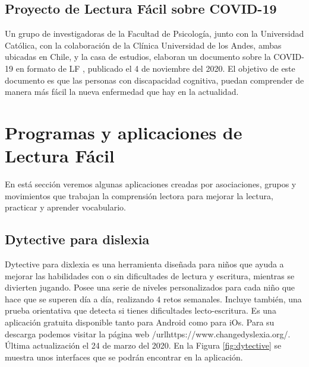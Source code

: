 \subsection{Proyecto de Lectura Fácil sobre COVID-19}

Un grupo de investigadoras de la Facultad de Psicología, junto con la Universidad Católica, con la colaboración de la Clínica Universidad de los Andes, ambas ubicadas en Chile, y la casa de estudios, elaboran un documento sobre la COVID-19 en formato de LF \citep{covid}, publicado el 4 de noviembre del 2020.
El objetivo de este documento es que las personas con discapacidad cognitiva, puedan comprender de manera más fácil la nueva enfermedad que hay en la actualidad.


\section{Programas y aplicaciones de Lectura Fácil}

En está sección veremos algunas aplicaciones creadas por asociaciones, grupos y movimientos que trabajan la comprensión lectora para mejorar la lectura, practicar y aprender vocabulario.

\subsection{Dytective para dislexia }
Dytective para dixlexia \citep{rello2018superar} es una herramienta diseñada para niños que ayuda a mejorar las habilidades con o sin dificultades de lectura y escritura, mientras se divierten jugando. Posee una serie de niveles personalizados para cada niño que hace que se superen día a día, realizando 4 retos semanales. Incluye también, una prueba orientativa que detecta si tienes dificultades lecto-escritura.
Es una aplicación gratuita disponible tanto para Android como para iOs. Para su descarga podemos visitar la página web /url{https://www.changedyslexia.org/}. Última actualización el 24 de marzo del 2020. En la Figura \ref{fig:dytective} se muestra unos interfaces que se podrán encontrar en la aplicación.


